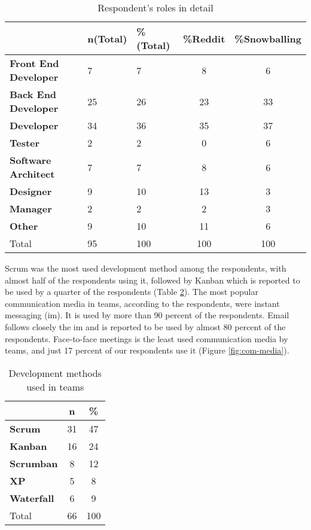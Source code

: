 \begin{table}
\centering
\caption{Respondent’s roles in detail} \label{table:roledetail}
\begin{tabular}{lllcc}
\hline
 & \textbf{n(Total)} & \textbf{\%(Total)} & \textbf{\%Reddit} & \textbf{\%Snowballing} \\ \hline
\textbf{Front End Developer}&7&7&8&6 \\
\textbf{Back End Developer}&25&26&23&33 \\
\textbf{Developer}&34&36&35&37 \\
\textbf{Tester}&2&2&0&6 \\
\textbf{Software Architect}&7&7&8&6 \\
\textbf{Designer}&9&10&13&3 \\
\textbf{Manager}&2&2&2&3 \\
\textbf{Other}&9&10&11&6 \\
Total&95&100&100&100 \\
\hline
\end{tabular}
\end{table}

Scrum was the most used development method among the respondents, with almost half of the respondents using it, followed by Kanban which is reported to be used by a quarter of the respondents (Table \ref{table:dm}). The most popular communication media in teams, according to the respondents, were instant messaging (\ac{im}). It is used by more than 90 percent of the respondents. Email follows closely the \ac{im} and is reported to be used by almost 80 percent of the respondents. Face-to-face meetings is the least used communication media by teams, and just 17 percent of our respondents use it (Figure \ref{fig:com-media}).

\begin{table}
\centering
\caption{Development methods used in teams} \label{table:dm}
\begin{tabular}{lcc}
\hline
 & \textbf{n} & \textbf{\%} \\ \hline
\textbf{Scrum}&31&47\\
\textbf{Kanban}&16&24\\
\textbf{Scrumban}&8&12\\
\textbf{XP}&5&8\\
\textbf{Waterfall}&6&9\\
Total&66&100\\
\hline
\end{tabular}
\end{table}



